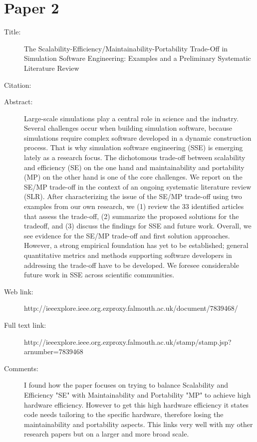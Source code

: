 \documentclass{scrartcl}
\begin{document}
\section*{Paper 2}
\begin{description}
\item[Title:] The Scalability-Efficiency/Maintainability-Portability Trade-Off in Simulation Software Engineering: Examples and a Preliminary Systematic Literature Review
\item[Citation:] \cite{SimulationMehl}
\item[Abstract:] Large-scale simulations play a central role in science and the industry. Several challenges occur when building simulation software, because simulations require complex software developed in a dynamic construction process. That is why simulation software engineering (SSE) is emerging lately as a research focus. The dichotomous trade-off between scalability and efficiency (SE) on the one hand and maintainability and portability (MP) on the other hand is one of the core challenges. We report on the SE/MP trade-off in the context of an ongoing systematic literature review (SLR). After characterizing the issue of the SE/MP trade-off using two examples from our own research, we (1) review the 33 identified articles that assess the trade-off, (2) summarize the proposed solutions for the tradeoff, and (3) discuss the findings for SSE and future work. Overall, we see evidence for the SE/MP trade-off and first solution approaches. However, a strong empirical foundation has yet to be established; general quantitative metrics and methods supporting software developers in addressing the trade-off have to be developed. We foresee considerable future work in SSE across scientific communities.
\item[Web link:] http://ieeexplore.ieee.org.ezproxy.falmouth.ac.uk/document/7839468/
\item[Full text link:] http://ieeexplore.ieee.org.ezproxy.falmouth.ac.uk/stamp/stamp.jsp?arnumber=7839468
\item[Comments:] 
I found how the paper focuses on trying to balance Scalability and Efficiency "SE" with Maintainability and Portability "MP" to achieve high hardware efficiency. 
However to get this high hardware efficiency it states code needs tailoring to the specific hardware, therefore losing the maintainability and portability aspects. This links very well with my other research papers but on a larger and more broad scale. 
\end{description}
\end{document}
